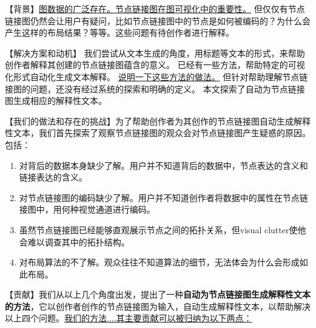 \maketitle

【背景】\underline{图数据的广泛存在。节点链接图在图可视化中的重要性。} 但仅仅有节点链接图仍然会让用户有疑问，比如节点链接图中的节点是如何被编码的？为什么会产生这样的布局结果？等等。这些问题有待创作者进行解释。

【解决方案和动机】
我们尝试从文本生成的角度，用标题等文本的形式，来帮助创作者解释其创建的节点链接图蕴含的意义。
已经有一些方法，帮助特定的可视化形式自动化生成文本解释。
\underline{说明一下这些方法的做法。}
但针对帮助理解节点链接图的问题，还没有经过系统的探索和明确的定义。
本文探索了自动为节点链接图生成相应的解释性文本。

【我们的做法和存在的挑战】为了帮助创作者为其创作的节点链接图自动生成解释性文本，我们首先探索了观察节点链接图的观众会对节点链接图产生疑惑的原因。包括：
\begin{enumerate}
    \item 对背后的数据本身缺少了解。用户并不知道背后的数据中，节点表达的含义和链接表达的含义。
    \item 对节点链接图的编码缺少了解。用户并不知道创作者将数据中的属性在节点链接图中，用何种视觉通道进行编码。
    \item 虽然节点链接图已经能够直观展示节点之间的拓扑关系，但visual clutter使他会难以调查其中的拓扑结构。
    \item 对布局算法的不了解。观众往往不知道算法的细节，无法体会为什么会形成如此布局。 %
\end{enumerate}

【贡献】我们从以上几个角度出发，提出了一种\textbf{自动为节点链接图生成解释性文本的方法}，它以创作者创作的节点链接图为输入，自动生成解释性文本，以帮助解决以上四个问题。\underline{我们的方法....其主要贡献可以被归纳为以下两点：}